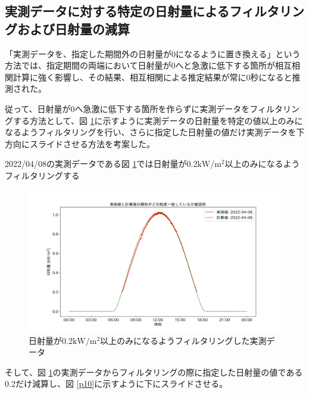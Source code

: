 \documentclass[a4j,12pt,]{jarticle}
\begin{document}
\subsection{実測データに対する特定の日射量によるフィルタリングおよび日射量の減算}
「実測データを、指定した期間外の日射量が0になるように置き換える」という方法では、指定期間の両端において日射量が0へと急激に低下する箇所が相互相関計算に強く影響し、その結果、相互相関による推定結果が常に0秒になると推測された。

従って、日射量が0へ急激に低下する箇所を作らずに実測データをフィルタリングする方法として、図 \ref{p9}に示すように実測データの日射量を特定の値以上のみになるようフィルタリングを行い、さらに指定した日射量の値だけ実測データを下方向にスライドさせる方法を考案した。

2022/04/08の実測データである図 \ref{p9}では日射量が0.2$\mathrm{kW}/\mathrm{m}^2$以上のみになるようフィルタリングする

\begin{figure}[H]
  \begin{center}
    \includegraphics[width=160mm]{2022-04-08_mask_by_q_plot.png}
    \caption{日射量が0.2$\mathrm{kW}/\mathrm{m}^2$以上のみになるようフィルタリングした実測データ}
    \label{p9}
  \end{center}
\end{figure}

そして、図 \ref{p9}の実測データからフィルタリングの際に指定した日射量の値である0.2だけ減算し、図 \ref{p10}に示すように下にスライドさせる。
\end{document}
